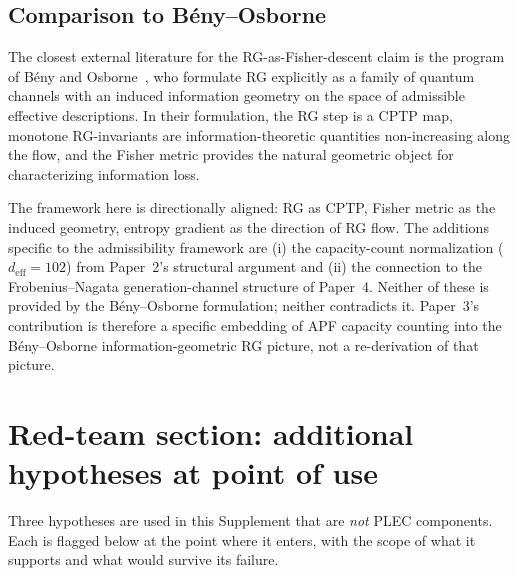 \documentclass[11pt]{article}
\theoremstyle{remark}
\begin{document}
\subsection{Comparison to B\'eny--Osborne}

The closest external literature for the RG-as-Fisher-descent claim is the
program of B\'eny and Osborne~\cite{BenyOsborne2015}, who formulate RG
explicitly as a family of quantum channels with an induced information
geometry on the space of admissible effective descriptions.  In their
formulation, the RG step is a CPTP map, monotone RG-invariants are
information-theoretic quantities non-increasing along the flow, and the
Fisher metric provides the natural geometric object for characterizing
information loss.

The framework here is directionally aligned: RG as CPTP, Fisher metric as
the induced geometry, entropy gradient as the direction of RG flow.  The
additions specific to the admissibility framework are (i) the
capacity-count normalization ($d_{\mathrm{eff}} = 102$) from Paper~2's
structural argument and (ii) the connection to the Frobenius--Nagata
generation-channel structure of Paper~4.  Neither of these is provided
by the B\'eny--Osborne formulation; neither contradicts it.  Paper~3's
contribution is therefore a specific embedding of APF capacity counting
into the B\'eny--Osborne information-geometric RG picture, not a
re-derivation of that picture.


\section{Red-team section: additional hypotheses at point of use}
\label{sec:redteam}

Three hypotheses are used in this Supplement that are \emph{not} PLEC
components.  Each is flagged below at the point where it enters, with
the scope of what it supports and what would survive its failure.
\end{document}
